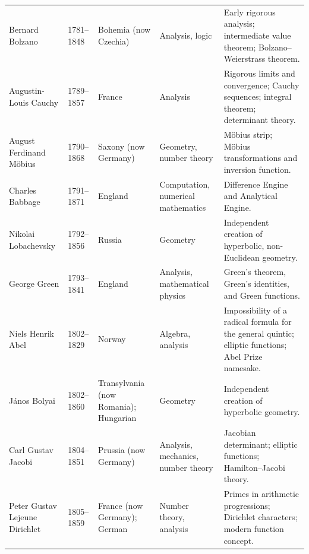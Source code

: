 {\begin{longtable}{@{}L{0.145\textwidth}L{0.09\textwidth}L{0.225\textwidth}L{0.14\textwidth}L{0.30\textwidth}@{}}
        Bernard Bolzano
        & 1781--1848
        & Bohemia (now Czechia)
        & Analysis, logic
        & Early rigorous analysis; intermediate value theorem; Bolzano--
          Weierstrass theorem. \\

        Augustin-Louis Cauchy
        & 1789--1857
        & France
        & Analysis
        & Rigorous limits and convergence; Cauchy sequences; integral theorem;
          determinant theory. \\

        August Ferdinand Möbius
        & 1790--1868
        & Saxony (now Germany)
        & Geometry, number theory
        & Möbius strip; Möbius transformations and inversion function. \\

        Charles Babbage
        & 1791--1871
        & England
        & Computation, numerical mathematics
        & Difference Engine and Analytical Engine. \\

        Nikolai Lobachevsky
        & 1792--1856
        & Russia
        & Geometry
        & Independent creation of hyperbolic, non-Euclidean geometry. \\

        George Green
        & 1793--1841
        & England
        & Analysis, mathematical physics
        & Green's theorem, Green's identities, and Green functions. \\

        Niels Henrik Abel
        & 1802--1829
        & Norway
        & Algebra, analysis
        & Impossibility of a radical formula for the general quintic; elliptic
          functions; Abel Prize namesake. \\

        János Bolyai
        & 1802--1860
        & Transylvania (now Romania); Hungarian
        & Geometry
        & Independent creation of hyperbolic geometry. \\

        Carl Gustav Jacobi
        & 1804--1851
        & Prussia (now Germany)
        & Analysis, mechanics, number theory
        & Jacobian determinant; elliptic functions; Hamilton--Jacobi theory. \\

        Peter Gustav Lejeune Dirichlet
        & 1805--1859
        & France (now Germany); German
        & Number theory, analysis
        & Primes in arithmetic progressions; Dirichlet characters; modern
          function concept. \\


\end{longtable}}
